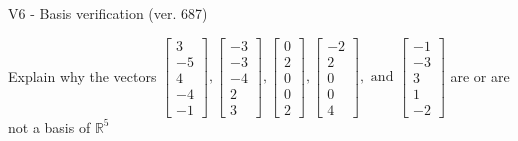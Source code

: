 \begin{exercise}
  \begin{exerciseTitle}V6 - Basis verification (ver. 687)\end{exerciseTitle}
  \begin{exerciseStatement}
    Explain why the vectors \(\left[\begin{array}{r}
3 \\
-5 \\
4 \\
-4 \\
-1
\end{array}\right] , \left[\begin{array}{r}
-3 \\
-3 \\
-4 \\
2 \\
3
\end{array}\right] , \left[\begin{array}{r}
0 \\
2 \\
0 \\
0 \\
2
\end{array}\right] , \left[\begin{array}{r}
-2 \\
2 \\
0 \\
0 \\
4
\end{array}\right] , \text{ and } \left[\begin{array}{r}
-1 \\
-3 \\
3 \\
1 \\
-2
\end{array}\right]\) are or are not a basis of \(\mathbb{R}^5\)	



\end{exerciseStatement}
\end{exercise}
